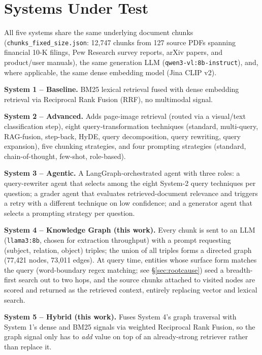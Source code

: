 \documentclass[sigconf,anonymous,review]{acmart}
\begin{document}
\section{Systems Under Test}

All five systems share the same underlying document chunks (\texttt{chunks\_fixed\_size.json}: 12{,}747 chunks from 127 source PDFs spanning financial 10-K filings, Pew Research survey reports, arXiv papers, and product/user manuals), the same generation LLM (\texttt{qwen3-vl:8b-instruct}), and, where applicable, the same dense embedding model (Jina CLIP v2).

\textbf{System 1 -- Baseline.} BM25 lexical retrieval fused with dense embedding retrieval via Reciprocal Rank Fusion (RRF), no multimodal signal.

\textbf{System 2 -- Advanced.} Adds page-image retrieval (routed via a visual/text classification step), eight query-transformation techniques (standard, multi-query, RAG-fusion, step-back, HyDE, query decomposition, query rewriting, query expansion), five chunking strategies, and four prompting strategies (standard, chain-of-thought, few-shot, role-based).

\textbf{System 3 -- Agentic.} A LangGraph-orchestrated agent with three roles: a query-rewriter agent that selects among the eight System-2 query techniques per question; a grader agent that evaluates retrieved-document relevance and triggers a retry with a different technique on low confidence; and a generator agent that selects a prompting strategy per question.

\textbf{System 4 -- Knowledge Graph (this work).} Every chunk is sent to an LLM (\texttt{llama3:8b}, chosen for extraction throughput) with a prompt requesting (subject, relation, object) triples; the union of all triples forms a directed graph (77{,}421 nodes, 73{,}011 edges). At query time, entities whose surface form matches the query (word-boundary regex matching; see \S\ref{sec:rootcause}) seed a breadth-first search out to two hops, and the source chunks attached to visited nodes are scored and returned as the retrieved context, entirely replacing vector and lexical search.

\textbf{System 5 -- Hybrid (this work).} Fuses System 4's graph traversal with System 1's dense and BM25 signals via weighted Reciprocal Rank Fusion, so the graph signal only has to \emph{add} value on top of an already-strong retriever rather than replace it.
\end{document}
